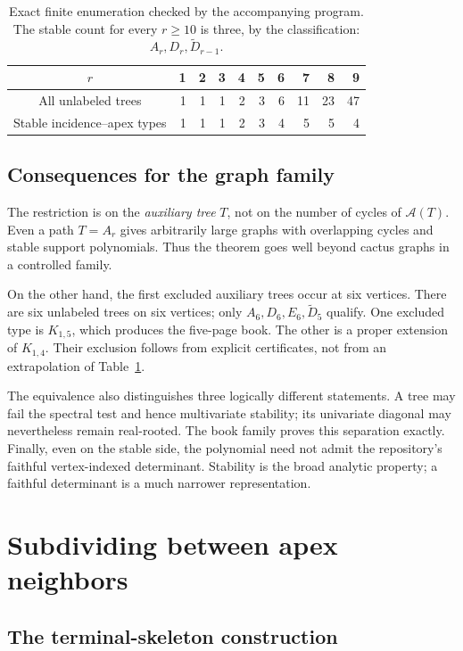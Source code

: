 \documentclass[11pt]{article}
\numberwithin{equation}{section}
\theoremstyle{definition}
\newcommand{\calA}{\mathcal A}
\begin{document}
\begin{table}[htbp]
\centering
\begin{tabular}{c|rrrrrrrrr}
\toprule
$r$ & 1&2&3&4&5&6&7&8&9\\
\midrule
All unlabeled trees &1&1&1&2&3&6&11&23&47\\
Stable incidence--apex types &1&1&1&2&3&4&5&5&4\\
\bottomrule
\end{tabular}
\caption{Exact finite enumeration checked by the accompanying program.
The stable count for every $r\ge10$ is three, by the classification:
$A_r,D_r,\widetilde D_{r-1}$.}
\label{ade:tab:ADEcounts}
\end{table}

\subsection{Consequences for the graph family}

The restriction is on the \emph{auxiliary tree} $T$, not on the number of
cycles of $\calA(T)$.  Even a path $T=A_r$ gives arbitrarily large graphs
with overlapping cycles and stable support polynomials.  Thus the theorem
goes well beyond cactus graphs in a controlled family.

On the other hand, the first excluded auxiliary trees occur at six
vertices.  There are six unlabeled trees on six vertices; only
$A_6,D_6,E_6,\widetilde D_5$ qualify.  One excluded type is $K_{1,5}$,
which produces the five-page book.  The other is a proper extension of
$K_{1,4}$.  Their exclusion follows from explicit certificates, not from
an extrapolation of Table~\ref{ade:tab:ADEcounts}.

The equivalence also distinguishes three logically different statements.
A tree may fail the spectral test and hence multivariate stability;
its univariate diagonal may nevertheless remain real-rooted.  The book
family proves this separation exactly.  Finally, even on the stable
side, the polynomial need not admit the repository's faithful
vertex-indexed determinant.  Stability is the broad analytic property;
a faithful determinant is a much narrower representation.

\section{Subdividing between apex neighbors}
\label{ade:sec:subdivision}

\subsection{The terminal-skeleton construction}
\end{document}
